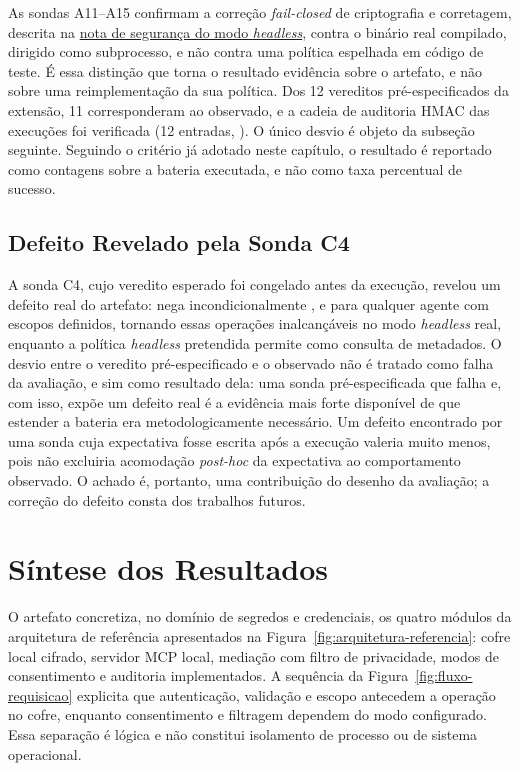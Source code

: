 As sondas A11--A15 confirmam a correção \textit{fail-closed} de criptografia e corretagem, descrita na \hyperref[nota:headless]{nota de segurança do modo \textit{headless}}, contra o binário real compilado, dirigido como subprocesso, e não contra uma política espelhada em código de teste. É essa distinção que torna o resultado evidência sobre o artefato, e não sobre uma reimplementação da sua política. Dos 12 vereditos pré-especificados da extensão, 11 corresponderam ao observado, e a cadeia de auditoria HMAC das execuções foi verificada (12 entradas, ). O único desvio é objeto da subseção seguinte. Seguindo o critério já adotado neste capítulo, o resultado é reportado como contagens sobre a bateria executada, e não como taxa percentual de sucesso.

\subsection{Defeito Revelado pela Sonda C4}
\label{sec:defeito-c4}
A sonda C4, cujo veredito esperado foi congelado antes da execução, revelou um defeito real do artefato:  nega incondicionalmente ,  e  para qualquer agente com escopos definidos, tornando essas operações inalcançáveis no modo \textit{headless} real, enquanto a política \textit{headless} pretendida permite  como consulta de metadados. O desvio entre o veredito pré-especificado e o observado não é tratado como falha da avaliação, e sim como resultado dela: uma sonda pré-especificada que falha e, com isso, expõe um defeito real é a evidência mais forte disponível de que estender a bateria era metodologicamente necessário. Um defeito encontrado por uma sonda cuja expectativa fosse escrita após a execução valeria muito menos, pois não excluiria acomodação \textit{post-hoc} da expectativa ao comportamento observado. O achado é, portanto, uma contribuição do desenho da avaliação; a correção do defeito consta dos trabalhos futuros.

\section{Síntese dos Resultados}
O artefato concretiza, no domínio de segredos e credenciais, os quatro módulos da arquitetura de referência apresentados na Figura~\ref{fig:arquitetura-referencia}: cofre local cifrado, servidor MCP local, mediação com filtro de privacidade, modos de consentimento e auditoria implementados. A sequência da Figura~\ref{fig:fluxo-requisicao} explicita que autenticação, validação e escopo antecedem a operação no cofre, enquanto consentimento e filtragem dependem do modo configurado. Essa separação é lógica e não constitui isolamento de processo ou de sistema operacional.

